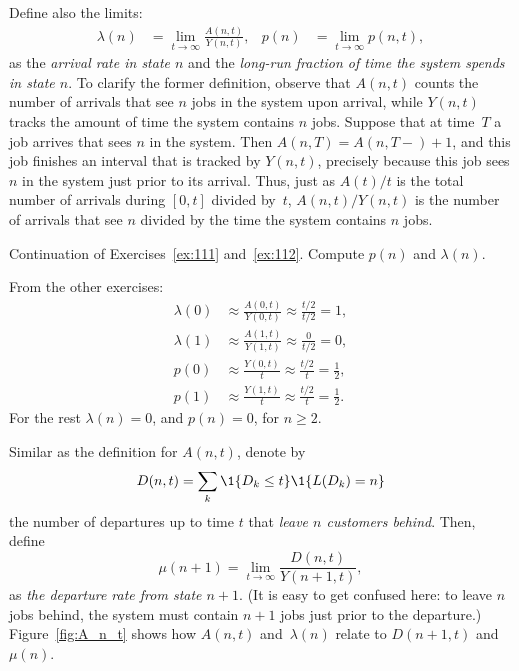 Define also the limits:
\begin{align}\label{eq:p(n)}
  \lambda(n) &= \lim_{t\to\infty} \frac{A(n,t)}{Y(n,t)}, &p(n) &=\lim_{t\to\infty} p(n,t),
\end{align}
as the \emph{arrival rate in state $n$} and the \emph{long-run fraction of
  time the system spends in state $n$}. To clarify the former
definition, observe that $A(n,t)$ counts the number of arrivals that
see $n$ jobs in the system upon arrival, while $Y(n,t)$ tracks the amount of time
the system contains $n$ jobs. Suppose that at time~$T$ a job arrives that
sees $n$ in the system. Then $A(n,T)=A(n, T-)+1$, and this job finishes
an interval that is tracked by $Y(n,t)$, precisely because this job
sees $n$ in the system just prior to its arrival. Thus, just as
$A(t)/t$ is the total number of arrivals during $[0,t]$ divided by~$t$, $A(n,t)/Y(n,t)$ is the number of arrivals that see $n$ divided by
the time the system contains $n$ jobs.

\begin{exercise}\label{ex:113} Continuation of Exercises~\ref{ex:111} and~\ref{ex:112}.  Compute $p(n)$  and $\lambda(n)$. 
  \begin{solution}
    From the other exercises:
    \begin{align*}
      \lambda(0) &\approx \frac{A(0,t)}{Y(0,t)} \approx \frac{t/2}{t/2} = 1, \\
      \lambda(1) &\approx \frac{A(1,t)}{Y(1,t)} \approx \frac{0}{t/2} = 0, \\
      p(0) &\approx \frac{Y(0,t)}{t} \approx \frac{t/2}{t} = \frac 1 2, \\
      p(1) &\approx \frac{Y(1,t)}{t} \approx \frac{t/2}{t} = \frac 1 2.
    \end{align*}
For the rest $\lambda(n) = 0$, and $p(n)=0$, for $n\geq 2$.
  \end{solution}
\end{exercise}

Similar as the definition for $A(n,t)$, denote by
\begin{equation*}
    D(n,t) = \sum_{k} \1{D_k \leq t} \1{L(D_k) = n}
  \end{equation*}
  the number of departures up to time $t$ that\emph{ leave $n$
    customers behind}. Then,  define
\begin{equation*}
  \mu(n+1) = \lim_{t\to\infty} \frac{D(n,t)}{Y(n+1,t)},
\end{equation*}
as \emph{ the departure rate from state $n+1$}. (It is easy to get
confused here: to leave $n$ jobs behind, the system must contain $n+1$
jobs just prior to the departure.) Figure~\ref{fig:A_n_t} shows how
$A(n,t)$ and~$\lambda(n)$ relate to $D(n+1,t)$ and $\mu(n)$.

